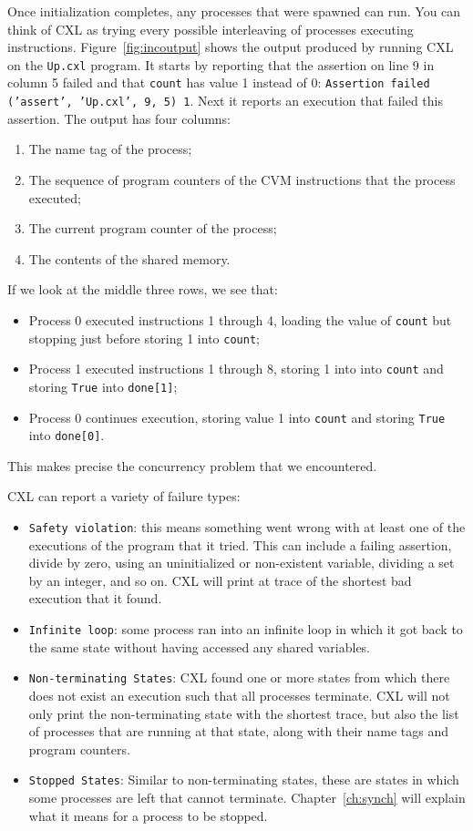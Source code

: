 \documentclass{report}
\begin{document}
Once initialization completes, any processes that were spawned can run.
You can think of CXL as trying every possible interleaving of processes executing
instructions.
Figure~\ref{fig:incoutput} shows the output produced by running CXL on the
\texttt{Up.cxl} program.
It starts by reporting that the assertion on line 9 in column 5 failed and that
\texttt{count} has value 1 instead of 0:
\texttt{Assertion failed (’assert’, ’Up.cxl’, 9, 5) 1}.
Next it reports an execution that failed this assertion.  The output has
four columns:
\begin{enumerate}
\item The name tag of the process;
\item The sequence of program counters of the CVM instructions that the process executed;
\item The current program counter of the process;
\item The contents of the shared memory.
\end{enumerate}

If we look at the middle three rows, we see that:
\begin{itemize}
\item Process 0 executed instructions 1 through 4, loading the value of
\texttt{count} but stopping just before storing 1 into \texttt{count};
\item Process 1 executed instructions 1 through 8, storing 1 into
into \texttt{count} and storing \texttt{True} into \texttt{done[1]};
\item Process 0 continues execution, storing value 1 into \texttt{count}
and storing \texttt{True} into \texttt{done[0]}.
\end{itemize}

This makes precise the concurrency problem that we encountered.

CXL can report a variety of failure types:
\begin{itemize}
\item \texttt{Safety violation}: this means something went wrong with
at least one of the executions of the program that it tried.  This
can include a failing assertion, divide by zero, using an uninitialized
or non-existent variable, dividing a set by an integer, and so on.
CXL will print at trace of the shortest bad execution that it found.
\item \texttt{Infinite loop}: some process ran into an infinite loop
in which it got back to the same state without having accessed any
shared variables.
\item \texttt{Non-terminating States}: CXL found one or more states
from which there does not exist an execution such that all processes
terminate.  CXL will not only print the non-terminating state with
the shortest trace, but also the list of processes that are running
at that state, along with their name tags and program counters.
\item \texttt{Stopped States}: Similar to non-terminating states,
these are states in which some processes are left that cannot
terminate.  Chapter~\ref{ch:synch} will explain what it means for
a process to be stopped.
\end{itemize}
\end{document}
